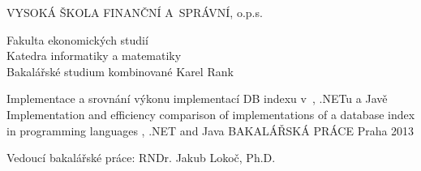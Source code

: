 \begin{titlepage}
\begin{center}
{\Large VYSOKÁ ŠKOLA FINANČNÍ A~SPRÁVNÍ, o.p.s.}

{\large Fakulta ekonomických studií\\
Katedra informatiky a matematiky\\
\vspace{3em}
Bakalářské studium kombinované}
\vfill
{\Large Karel Rank\\[1in]}

{\large Implementace a srovnání výkonu implementací DB indexu v~\CC, .NETu a Javě\\
Implementation and efficiency comparison of implementations of a database index in programming languages \CC, .NET and Java}
\vfill
{\Large BAKALÁŘSKÁ PRÁCE}
\vfill
{\large Praha 2013}

\end{center}
{\large Vedoucí bakalářské práce: RNDr. Jakub Lokoč, Ph.D.}
\end{titlepage}